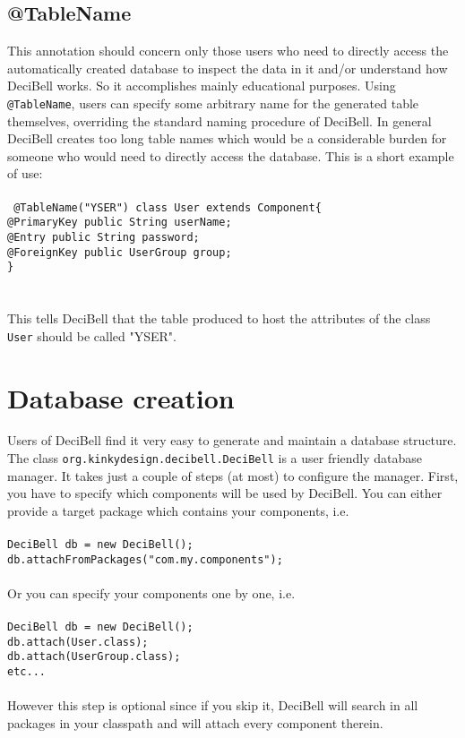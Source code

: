 \documentclass[a4paper,10pt]{article}
\begin{document}
\subsection*{@TableName}\label{tablename}
This annotation should concern only those users who need to directly access the automatically 
created database to inspect the data in it and/or understand how DeciBell works. So it 
accomplishes mainly educational purposes. Using \texttt{@TableName}, users can specify some
arbitrary name for the generated table themselves, overriding the standard naming
procedure of DeciBell. In general DeciBell creates too long table names which would
be a considerable burden for someone who would need to directly access the database. This is a short 
example of use:\\\\
\texttt{
@TableName("YSER") class User extends Component\{\\
\hspace*{6}   @PrimaryKey public String userName;\\
\hspace*{6}   @Entry public String password;\\
\hspace*{6}   @ForeignKey public UserGroup group;\\ 
\}\\
}\\\label{user_table_name}
\\\noindent
This tells DeciBell that the table produced to host the attributes of the class \texttt{User}
should be called "YSER".

\section*{Database creation}\label{dbcreation}
Users of DeciBell find it very easy to generate and maintain a database structure. 
The class \texttt{org.kinkydesign.decibell.DeciBell} is a user friendly database manager.
It takes just a couple of steps (at most) to configure the manager. First, you have to specify which 
components will be used by DeciBell. You can either provide a target package which contains your
components, i.e.
\texttt{\\\\ DeciBell db = new DeciBell();\\db.attachFromPackages("com.my.components");\\ }
\\Or you can specify your components one by one, i.e.
\texttt{\\\\ DeciBell db = new DeciBell();\\db.attach(User.class);\\db.attach(UserGroup.class);\\etc...\\ }
\\However this step is optional since if you skip it, DeciBell will search in all packages 
in your classpath and will attach every component therein. 
\end{document}
